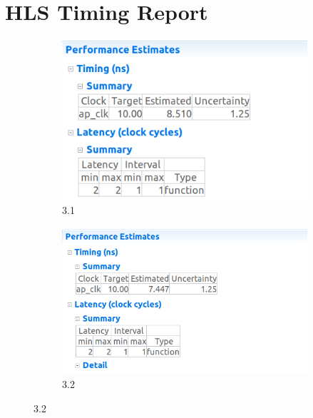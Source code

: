 \documentclass{article}
\begin{document}
\section{HLS Timing Report}
\vspace{1cm}
\begin{figure}[h]
\centering
\begin{subfigure}[b]{0.8\textwidth}
    \centering
\includegraphics[width=\textwidth]{figs/32a.png}
    \caption{3.1}
    \label{fig:my_label}
\end{subfigure}
\hfill
\begin{subfigure}[b]{0.8\textwidth}
    \centering
\includegraphics[width=\textwidth]{figs/32b.png}
    \caption{3.2}
    \label{fig:my_label}
\end{subfigure}
\end{figure}

\vspace{5cm}
\end{document}
